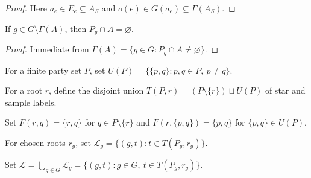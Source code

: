 \begin{proof}\leanok
    Here $a_e\in E_e\subseteq A_S$ and $o(e)\in G(a_e)\subseteq\Gamma(A_S)$.
\end{proof}

\begin{lemma}
    \label{thm:compression_exterior_disjoint}
    \leanok
    If $g\in G\setminus\Gamma(A)$, then $P_g\cap A=\varnothing$.
\end{lemma}

\begin{proof}\leanok
    Immediate from $\Gamma(A)=\{g\in G:P_g\cap A\ne\varnothing\}$.
\end{proof}

\begin{definition}
    \label{def:compression_pair_labels}
    \leanok
    For a finite party set $P$, set $U(P)=\{\{p,q\}:p,q\in P,\ p\ne q\}$.
\end{definition}

\begin{definition}
    \label{def:compression_gate_labels}
    \leanok
    For a root $r$, define the disjoint union $T(P,r)=(P\setminus\{r\})\sqcup U(P)$ of star and sample labels.
\end{definition}

\begin{definition}
    \label{def:compression_gate_link_parties}
    \leanok
    Set $F(r,q)=\{r,q\}$ for $q\in P\setminus\{r\}$ and $F(r,\{p,q\})=\{p,q\}$ for $\{p,q\}\in U(P)$.
\end{definition}

\begin{definition}
    \label{def:compression_gate_links}
    \leanok
    For chosen roots $r_g$, set $\mathcal L_g=\{(g,t):t\in T(P_g,r_g)\}$.
\end{definition}

\begin{definition}
    \label{def:compression_distributed_links}
    \leanok
    Set $\mathcal L=\bigcup_{g\in G}\mathcal L_g=\{(g,t):g\in G,\ t\in T(P_g,r_g)\}$.
\end{definition}


